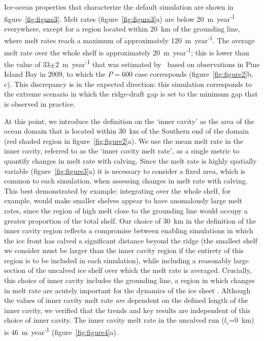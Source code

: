 \documentclass[draft]{agujournal2019}
\begin{document}
Ice-ocean properties that characterize the default simulation are shown in figure~\ref{fig:figure3}. Melt rates (figure~\ref{fig:figure3}a) are below  20~m~year\textsuperscript{-1} everywhere, except for a region located within 20~km of the grounding line, where melt rates reach a maximum of approximately 120~m~year\textsuperscript{-1}. The average melt rate over the whole shelf is approximately 20~m~year\textsuperscript{-1}; this is lower than the value of 33$\pm$2~m~year\textsuperscript{-1} that was estimated by~ based on observations in Pine Island Bay in 2009, to which the $P=600$ case corresponds (figure~\ref{fig:figure2}b, c). This discrepancy is in the expected direction: this simulation corresponds to the extreme scenario in which the ridge-draft gap is set to the minimum gap that is observed in practice.

At this point, we introduce the definition on the `inner cavity' as the area of the ocean domain that is located within 30~km of the Southern end of the domain (red shaded region in figure~\ref{fig:figure2}a). We use the mean melt rate in the inner cavity, referred to as the `inner cavity melt rate', as a single metric to quantify changes in melt rate with calving. Since the melt rate is highly spatially variable (figure~\ref{fig:figure3}a) it is necessary to consider a fixed area, which is common to each simulation, when assessing changes in melt rate with calving. This best demonstrated by example: integrating over the whole shelf, for example, would make smaller shelves appear to have anomalously large melt rates, since the region of high melt close to the grounding line would occupy a greater proportion of the total shelf. %
Our choice of 30~km in the definition of the inner cavity region reflects a compromise between enabling simulations in which the ice front has calved a significant distance beyond the ridge (the smallest shelf we consider must be larger than the inner cavity region if the entirety of this region is to be included in each simulation), while including a reasonably large section of the uncalved ice shelf over which the melt rate is averaged. Crucially, this choice of inner cavity includes the grounding line, a region in which changes in melt rate are acutely important for the dynamics of the ice sheet \cite{Seroussi2014Cryo, Athern2017GRL}. Although the values of inner cavity melt rate \textit{are} dependent on the defined length of the inner cavity, we verified that the trends and key results are independent of this choice of inner cavity. The inner cavity melt rate in the uncalved run ($l_c$=0~km) is 46~m~year\textsuperscript{-1} (figure~\ref{fig:figure4}a).
\end{document}

